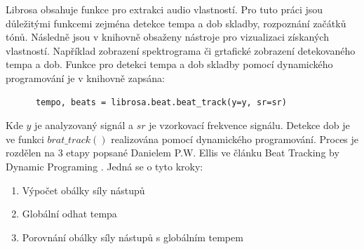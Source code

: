     Librosa obsahuje funkce pro extrakci audio vlastností.
    Pro tuto práci jsou důležitými funkcemi zejména detekce tempa a dob skladby, rozpoznání začátků tónů. Následně jsou v knihovně obsaženy nástroje pro vizualizaci získaných vlastností. Například zobrazení spektrograma či grtafické zobrazení detekovaného tempa a dob.
    Funkce pro detekci tempa a dob skladby pomocí dynamického programování je v knihovně zapsána:

    \begin{lstlisting}
      tempo, beats = librosa.beat.beat_track(y=y, sr=sr)
    \end{lstlisting}
    
    Kde $ y $ je analyzovaný signál a $ sr $ je vzorkovací frekvence signálu.
    Detekce dob je ve funkci $ brat\_track() $ realizována pomocí dynamického programování. Proces je rozdělen na 3 etapy popsané Danielem P.W. Ellis ve článku Beat Tracking by Dynamic Programing \cite{Beat_tracking_by_dynamic_programing}. Jedná se o tyto kroky:

    \smallskip

    \begin{enumerate}
      \item Výpočet obálky síly nástupů
      \item Globální odhat tempa
      \item Porovnání obálky síly nástupů s globálním tempem
    \end{enumerate}

    \smallskip

